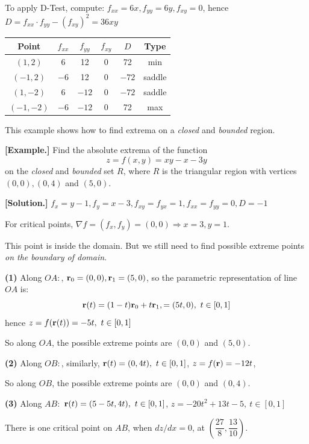 \documentclass[11pt, a4paper]{MATH2023}
\newcommand{\eg}{\textbf{[Example.] }}
\newcommand{\sol}{\textbf{[Solution.] }}
\newcommand{\rr}{{\bf r}}
\begin{document}
\begin{spacing}{1.3}
    To apply D-Test, compute:
    $f_{xx}=6x, f_{yy}=6y, f_{xy}=0$, hence $D=f_{xx}\cdot f_{yy}-(f_{xy})^2= 36xy$

    \begin{center}
        \begin{tabular}{c|c|c|c|c|c}\hline\hline
            Point & $f_{xx}$ & $f_{yy}$ & $f_{xy}$ & $D$ & Type\\\hline\hline
            $(1,2)$ & 6 & 12 & 0 & 72 & min \\\hline
            $(-1,2)$ & $-6$ & 12 & 0 & $-72$ & saddle\\\hline
            $(1,-2)$ & 6 & $-12$ & 0 & $-72$ & saddle\\\hline
            $(-1,-2)$ & $-6$ & $-12$ & 0 & 72 & max\\\hline
        \end{tabular}
    \end{center}



    \newpage
    {\blue This example shows how to find extrema on a {\it closed} and {\it bounded} region.}

    \eg Find the absolute extrema of the function
    $$z=f(x, y)=x y-x-3 y$$
    on the {\it closed} and {\it bounded} set $R$, where $R$ is the triangular 
    region with vertices $(0,0),(0,4)$ and $(5,0)$.

    \sol $f_x=y-1, f_y=x-3, f_{xy}=f_{yx}=1, f_{xx}=f_{yy}=0, D=-1$

    For critical points, $\nabla f=(f_x, f_y)=(0,0) \Rightarrow x=3, y=1$.

    This point is inside the domain. But we still need to find possible 
    extreme points {\it on the boundary of domain}.

    {\bf (1)} Along $OA:$, $\rr_0=(0,0), \rr_1=(5,0)$, so the parametric representation 
    of line $OA$ is:
    $$\rr(t)=(1-t)\rr_0+t\rr_1,=(5t, 0),\ t\in [0,1]$$
    hence $z=f(\rr(t))=-5t,\ t\in [0,1]$

    So along $OA$, the possible extreme points are $(0,0)$ and $(5,0)$.

    {\bf (2)} Along $OB:$, similarly, $\rr(t)=(0, 4t),\ t\in [0,1]$, 
    $z=f(\rr)=-12t$,

    So along $OB$, the possible extreme points are $(0,0)$ and $(0,4)$.

    {\bf (3)} Along $AB:$ $\rr(t)=(5-5t, 4t),\ t\in [0,1]$,
    $z=-20t^2+13t-5,\ t\in [0,1]$

    There is one critical point on $AB$, when $dz/dx=0$, at $\left(\dfrac{27}{8}, \dfrac{13}{10}\right)$.


\end{spacing}
\end{document}
